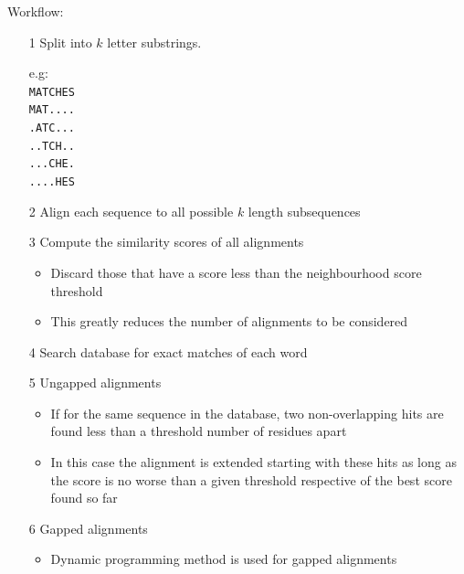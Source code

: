 \documentclass[a4paper]{article}
\begin{document}
Workflow:

\begin{enumerate}
  \item[1]
    Split into $k$ letter substrings.

    e.g:
    \texttt{\hfill \\
      MATCHES \\
      MAT.... \\
      .ATC... \\
      ..TCH.. \\
      ...CHE. \\
      ....HES \\
    }

  \item[2]
    Align each sequence to all possible $k$ length subsequences

  \item[3]
    Compute the similarity scores of all alignments

    \begin{itemize}
      \item
        Discard those that have a score less than the neighbourhood score
        threshold

      \item
        This greatly reduces the number of alignments to be considered
    \end{itemize}

  \item[4]
    Search database for exact matches of each word

  \item[5]
    Ungapped alignments

    \begin{itemize}
      \item
        If for the same sequence in the database, two non-overlapping hits are
        found less than a threshold number of residues apart

      \item
        In this case the alignment is extended starting with these hits as long
        as the score is no worse than a given threshold respective of the best
        score found so far
    \end{itemize}

  \item[6]
    Gapped alignments

    \begin{itemize}
      \item
        Dynamic programming method is used for gapped alignments
    \end{itemize}
\end{enumerate}
\end{document}
